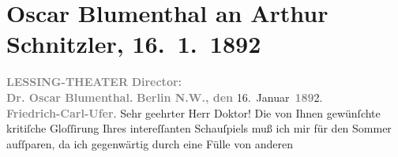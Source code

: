 

         
         \renewcommand{\erwaehntePersonen}{Personen: Emanuel Reicher}
         \renewcommand{\erwaehnteInstitutionen}{Institutionen: Emanuel Reicher’s Deutsche Gastspielgesellschaft, Lessing-Theater}
         \renewcommand{\erwaehnteOrte}{Orte: Alexanderstraße, Berlin, Kapelle-Ufer, Wien}
         \renewcommand{\erwaehnteWerke}{Werke: Das Märchen. Schauspiel in drei Aufzügen, Tagebuch}
               \section[Oscar Blumenthal an Arthur Schnitzler, 16. 1. 1892]{ Oscar Blumenthal an Arthur Schnitzler, 16. 1. 1892}\nopagebreak{}\rehead{ }\begin{ledgroupsized}[t]{13cm}\normalsize\beginnumbering \toendnotes[C]{\smallbreak\pagebreak[2]} 
\toendnotes[C]{\smallbreak}\pstart
           \noindent{}\centering{}{\pb}\textcolor{gray}{\textbf{LESSING-THEATER}}\pend
           \pstart
           \noindent{}\centering{}\textcolor{gray}{\textbf{Director:}}{\\}\textcolor{gray}{\textbf{Dr. Oscar Blumenthal.}}\pend
           \pstart
           \noindent{}\raggedleft{}\textcolor{gray}{\textbf{Berlin N.W., den}}{ }16. Januar \textcolor{gray}{\textbf{189}}2.{\\}\textcolor{gray}{\textbf{Friedrich-Carl-Ufer}}.\pend
           \pstart\center{}Sehr geehrter Herr Doktor!\pend\pstart
           Die von Ihnen gewünſchte kritiſche Gloſſirung Ihres intereſſanten Schauſpiels muß ich mir für den
                  Sommer aufſparen, da ich gegenwärtig durch eine Fülle von anderen

\end{ledgroupsized}
